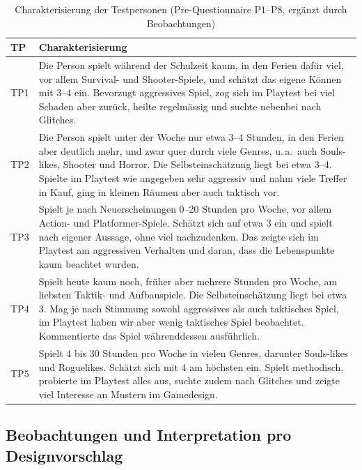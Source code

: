 \documentclass[../Main.tex]{subfiles}
\begin{document}
\begin{table}[H]
    \centering
    \small
    \renewcommand{\arraystretch}{1.3}
    \begin{tabular}{|>{\raggedright\arraybackslash}p{1.2cm}|>{\raggedright\arraybackslash}p{12.6cm}|}
        \hline
        \textbf{TP} & \textbf{Charakterisierung} \\
        \hline
        TP1 & Die Person spielt während der Schulzeit kaum, in den Ferien dafür viel, vor allem Survival- und Shooter-Spiele, und schätzt das eigene Können mit 3--4 ein. Bevorzugt aggressives Spiel, zog sich im Playtest bei viel Schaden aber zurück, heilte regelmässig und suchte nebenbei nach Glitches. \\
        \hline
        TP2 & Die Person spielt unter der Woche nur etwa 3--4 Stunden, in den Ferien aber deutlich mehr, und zwar quer durch viele Genres, u.\,a.\ auch Souls-likes, Shooter und Horror. Die Selbsteinschätzung liegt bei etwa 3--4. Spielte im Playtest wie angegeben sehr aggressiv und nahm viele Treffer in Kauf, ging in kleinen Räumen aber auch taktisch vor. \\
        \hline
        TP3 & Spielt je nach Neuerscheinungen 0--20 Stunden pro Woche, vor allem Action- und Platformer-Spiele. Schätzt sich auf etwa 3 ein und spielt nach eigener Aussage, ohne viel nachzudenken. Das zeigte sich im Playtest am aggressiven Verhalten und daran, dass die Lebenspunkte kaum beachtet wurden. \\
        \hline
        TP4 & Spielt heute kaum noch, früher aber mehrere Stunden pro Woche, am liebsten Taktik- und Aufbauspiele. Die Selbsteinschätzung liegt bei etwa 3. Mag je nach Stimmung sowohl aggressives als auch taktisches Spiel, im Playtest haben wir aber wenig taktisches Spiel beobachtet. Kommentierte das Spiel währenddessen ausführlich. \\
        \hline
        TP5 & Spielt 4 bis 30 Stunden pro Woche in vielen Genres, darunter Souls-likes und Roguelikes. Schätzt sich mit 4 am höchsten ein. Spielt methodisch, probierte im Playtest alles aus, suchte zudem nach Glitches und zeigte viel Interesse an Mustern im Gamedesign. \\
        \hline
    \end{tabular}
    \caption{Charakterisierung der Testpersonen (Pre-Questionnaire P1--P8, ergänzt durch Beobachtungen)}
    \label{tab:Testpersonen}
\end{table}


\subsection{Beobachtungen und Interpretation pro Designvorschlag} \label{sec:ErgVorschlag} \label{sec:Interpretation}
\end{document}
